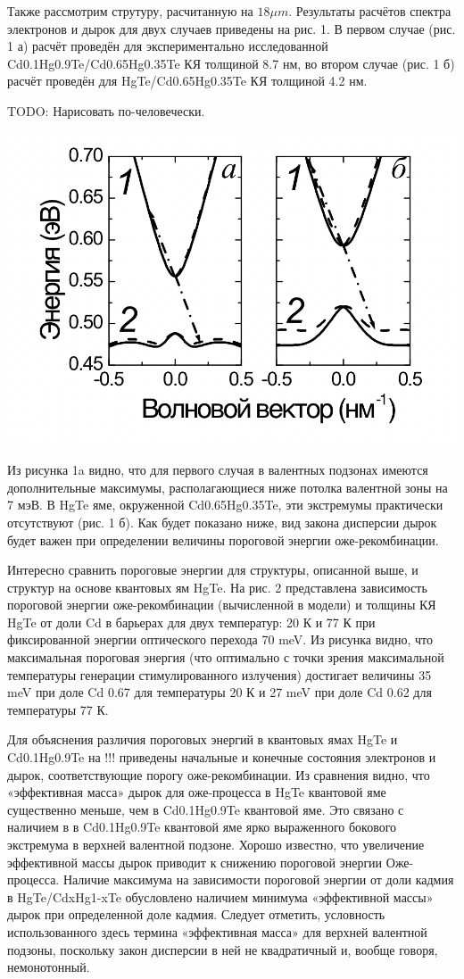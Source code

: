 \documentclass[../main.tex]{subfiles}
\begin{document}
    Также рассмотрим струтуру, расчитанную на $18\mu m$. 
    Результаты расчётов спектра электронов и дырок для двух случаев приведены на рис. 1. В первом случае (рис. 1 а) расчёт проведён 
    для экспериментально исследованной Cd0.1Hg0.9Te/Cd0.65Hg0.35Te КЯ толщиной 8.7 нм, во втором случае (рис. 1 б) расчёт проведён для 
    HgTe/Cd0.65Hg0.35Te КЯ толщиной 4.2 нм.

    \begin{center}
        TODO: Нарисовать по-человечески.


        \includegraphics[width=0.5\linewidth]{./images/dummy_18mkm.png}
    \end{center}

    Из рисунка 1a видно, что для первого случая в валентных подзонах имеются дополнительные максимумы, располагающиеся ниже потолка валентной 
    зоны на 7 мэВ. В HgTe яме, окруженной Cd0.65Hg0.35Te, эти экстремумы практически отсутствуют (рис. 1 б). Как будет показано ниже, вид 
    закона дисперсии дырок будет важен при определении величины пороговой энергии оже-рекомбинации.

    Интересно сравнить пороговые энергии для структуры, описанной выше, и структур на основе квантовых ям HgTe. На рис. 2 представлена 
    зависимость пороговой энергии оже-рекомбинации (вычисленной в модели) и толщины КЯ HgTe от доли Cd в барьерах для двух температур: 
    20 К и 77 К при фиксированной энергии оптического перехода 70 meV. Из рисунка видно, что максимальная пороговая энергия (что оптимально 
    с точки зрения максимальной температуры генерации стимулированного излучения) достигает величины 35 meV при доле Cd 0.67 для температуры 
    20 К и 27 meV при доле Cd 0.62 для температуры 77 К.

    Для объяснения различия пороговых энергий в квантовых ямах HgTe и Cd0.1Hg0.9Te на !!! приведены начальные и конечные состояния электронов 
    и дырок, соответствующие порогу оже-рекомбинации. Из сравнения видно, что «эффективная масса» дырок для оже-процесса в HgTe квантовой яме 
    существенно меньше, чем в Cd0.1Hg0.9Te квантовой яме. Это связано с наличием в в Cd0.1Hg0.9Te квантовой яме ярко выраженного бокового 
    экстремума в верхней валентной подзоне. Хорошо известно, что увеличение эффективной массы дырок приводит к снижению пороговой энергии 
    Оже-процесса. Наличие максимума на зависимости пороговой энергии от доли кадмия в HgTe/CdxHg1-xTe обусловлено наличием минимума 
    «эффективной массы» дырок при определенной доле кадмия. Следует отметить, условность использованного здесь термина «эффективная масса» 
    для верхней валентной подзоны, поскольку закон дисперсии в ней не квадратичный и, вообще говоря, немонотонный.
\end{document}
